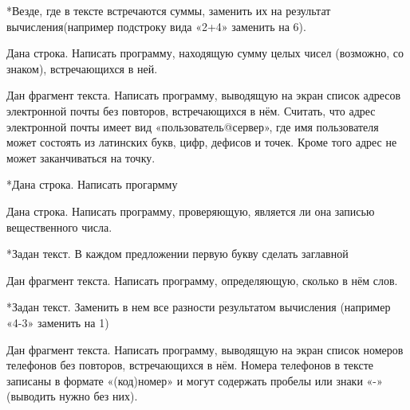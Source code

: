 *\task Везде, где в тексте встречаются суммы, заменить их на результат
вычисления(например подстроку вида «2+4» заменить на 6).

\task Дана строка. Написать программу, находящую сумму целых чисел
(возможно, со знаком), встречающихся в ней.

\task Дан фрагмент текста. Написать программу, выводящую на экран
список адресов электронной почты без повторов, встречающихся в
нём. Считать, что адрес электронной почты имеет вид
«пользователь@сервер», где имя пользователя может состоять из
латинских букв, цифр, дефисов и точек. Кроме того адрес не может
заканчиваться на точку.

*\task Дана строка. Написать прогармму

\task Дана строка. Написать программу, проверяющую, является ли она
записью вещественного числа.

*\task Задан текст. В каждом предложении первую букву сделать заглавной

\task Дан фрагмент текста. Написать программу, определяющую, сколько в нём слов.

*\task Задан текст. Заменить в нем все разности результатом вычисления
(например «4-3» заменить на 1)

\task Дан фрагмент текста. Написать программу, выводящую на экран
список номеров телефонов без повторов, встречающихся в нём. Номера
телефонов в тексте записаны в формате «(код)номер» и могут содержать
пробелы или знаки «-» (выводить нужно без них).
